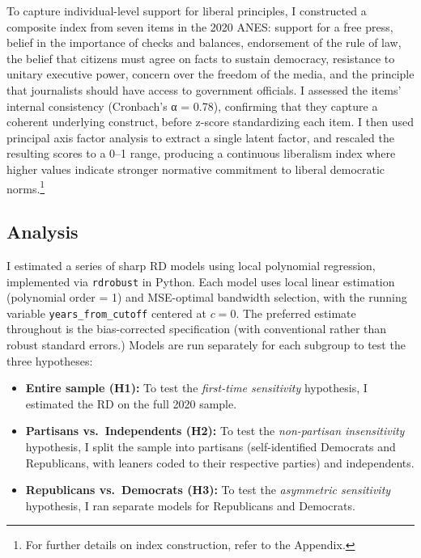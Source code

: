 \documentclass[
  10pt,
  letterpaper,
  DIV=11,
  numbers=noendperiod]{scrartcl}
\providecommand{\tightlist}{%
  \setlength{\itemsep}{0pt}\setlength{\parskip}{0pt}}
\begin{document}
To capture individual-level support for liberal principles, I
constructed a composite index from seven items in the 2020 ANES: support
for a free press, belief in the importance of checks and balances,
endorsement of the rule of law, the belief that citizens must agree on
facts to sustain democracy, resistance to unitary executive power,
concern over the freedom of the media, and the principle that
journalists should have access to government officials. I assessed the
items' internal consistency (Cronbach's α = 0.78), confirming that they
capture a coherent underlying construct, before z-score standardizing
each item. I then used principal axis factor analysis to extract a
single latent factor, and rescaled the resulting scores to a 0--1 range,
producing a continuous liberalism index where higher values indicate
stronger normative commitment to liberal democratic norms.\footnote{For
  further details on index construction, refer to the Appendix.}

\subsection{Analysis}\label{analysis}

I estimated a series of sharp RD models using local polynomial
regression, implemented via \texttt{rdrobust} in Python. Each model uses
local linear estimation (polynomial order = 1) and MSE-optimal bandwidth
selection, with the running variable \texttt{years\_from\_cutoff}
centered at \(c = 0\). The preferred estimate throughout is the
bias-corrected specification (with conventional rather than robust
standard errors.) Models are run separately for each subgroup to test
the three hypotheses:

\begin{itemize}
\tightlist
\item
  \textbf{Entire sample (H1):} To test the \emph{first-time sensitivity}
  hypothesis, I estimated the RD on the full 2020 sample.
\item
  \textbf{Partisans vs.~Independents (H2):} To test the
  \emph{non-partisan insensitivity} hypothesis, I split the sample into
  partisans (self-identified Democrats and Republicans, with leaners
  coded to their respective parties) and independents.
\item
  \textbf{Republicans vs.~Democrats (H3):} To test the \emph{asymmetric
  sensitivity} hypothesis, I ran separate models for Republicans and
  Democrats.
\end{itemize}
\end{document}
